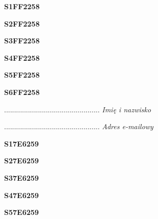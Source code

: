 \begin{turn}{90}\huge \textbf{S1FF2258}\end{turn}

\begin{turn}{90}\huge \textbf{S2FF2258}\end{turn}

\begin{turn}{90}\huge \textbf{S3FF2258}\end{turn}

\begin{turn}{90}\huge \textbf{S4FF2258}\end{turn}

\begin{turn}{90}\huge \textbf{S5FF2258}\end{turn}

\begin{turn}{90}\huge \textbf{S6FF2258}\end{turn}

\begin{turn}{90}\begin{minipage}{\linewidth} \vspace{20mm} ................................................  \textit{Imię i nazwisko}\end{minipage}\end{turn}

\begin{turn}{90}\begin{minipage}{\linewidth} \vspace{20mm} ................................................  \textit{Adres e-mailowy}\end{minipage}\end{turn}

\begin{turn}{90}\huge \textbf{S17E6259}\end{turn}

\begin{turn}{90}\huge \textbf{S27E6259}\end{turn}

\begin{turn}{90}\huge \textbf{S37E6259}\end{turn}

\begin{turn}{90}\huge \textbf{S47E6259}\end{turn}

\begin{turn}{90}\huge \textbf{S57E6259}\end{turn}


